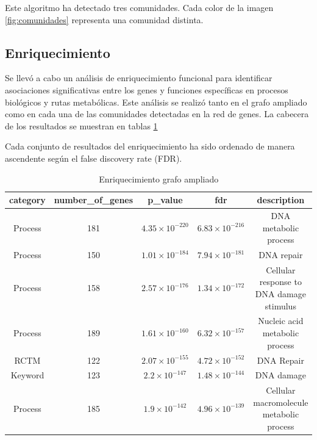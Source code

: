 Este algoritmo ha detectado tres comunidades. Cada color de la imagen \ref{fig:comunidades} representa una comunidad distinta.

\subsection{Enriquecimiento}

Se llevó a cabo un análisis de enriquecimiento funcional para identificar asociaciones significativas entre los genes y funciones específicas en procesos biológicos y rutas metabólicas. Este análisis se realizó tanto en el grafo ampliado como en cada una de las comunidades detectadas en la red de genes. La cabecera de los resultados se muestran en tablas \ref{tabla:enrique200}

Cada conjunto de resultados del enriquecimiento ha sido ordenado de manera ascendente según el false discovery rate (FDR).


\begin{table}[h]
	\centering
	\caption{Enriquecimiento grafo ampliado}
	\label{tabla:enrique200}
	\begin{tabular}{|c|c|c|c|c|}
		\hline
		category & number\_of\_genes & p\_value & fdr & description \\
		\hline
		Process & 181 & $4.35 \times 10^{-220}$ & $6.83 \times 10^{-216}$ & DNA metabolic process \\
		Process & 150 & $1.01 \times 10^{-184}$ & $7.94 \times 10^{-181}$ & DNA repair \\
		Process & 158 & $2.57 \times 10^{-176}$ & $1.34 \times 10^{-172}$ & Cellular response to DNA damage stimulus \\
		Process & 189 & $1.61 \times 10^{-160}$ & $6.32 \times 10^{-157}$ & Nucleic acid metabolic process \\
		RCTM & 122 & $2.07 \times 10^{-155}$ & $4.72 \times 10^{-152}$ & DNA Repair \\

		Keyword & 123 & $2.2 \times 10^{-147}$ & $1.48 \times 10^{-144}$ & DNA damage \\
		Process & 185 & $1.9 \times 10^{-142}$ & $4.96 \times 10^{-139}$ & Cellular macromolecule metabolic process \\
		\hline
	\end{tabular}
\end{table}